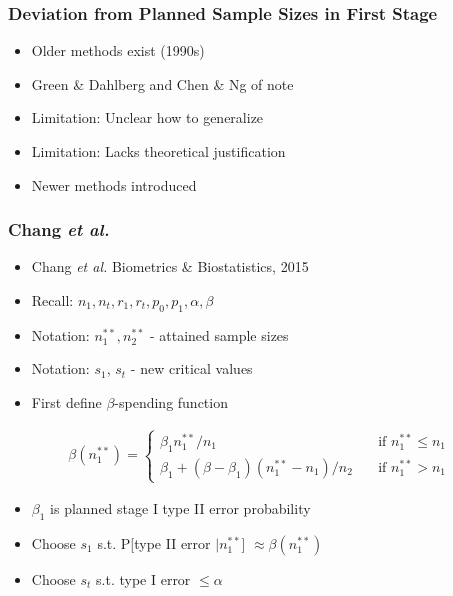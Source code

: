 \documentclass{beamer}\usepackage[]{graphicx}\usepackage[]{color}
\begin{document}
\begin{frame}
\frametitle{Deviation from Planned Sample Sizes in First Stage}
    \begin{itemize}
        \item Older methods exist (1990s)
        \item Green \& Dahlberg and Chen \& Ng of note
        \item Limitation: Unclear how to generalize
        \item Limitation: Lacks theoretical justification
        \item Newer methods introduced
    \end{itemize}
\end{frame}



\begin{frame}
\frametitle{Chang \textit{et al.}}
    \begin{itemize}
        \item Chang \textit{et al.} Biometrics \& Biostatistics, 2015
        \item Recall: $n_1, n_t, r_1, r_t, p_0, p_1, \alpha, \beta$
        \item Notation: $n_1^{\ast\ast}, n_2^{\ast\ast}$ - attained sample sizes
        \item Notation: $s_1$, $s_t$ - new critical values
        \item First define $\beta$-spending function
    \end{itemize}
\begin{equation*}
\begin{aligned}
\beta(n_1^{\ast\ast}) = \left\{
        \begin{array}{ll}
            \beta_1 n_1^{\ast\ast}/n_1 & \quad \text{if } n_1^{\ast\ast} \leq n_1 \\
            \beta_1 + (\beta - \beta_1)(n_1^{\ast\ast} - n_1)/n_2 & \quad \text{if } n_1^{\ast\ast} > n_1
        \end{array}
    \right.
\end{aligned}
\end{equation*}
  \begin{itemize}
      \item $\beta_1$ is planned stage I type II error probability
      \item Choose $s_1$ s.t. P[type II error $\vert n_1^{\ast\ast}$] $\approx \beta(n_1^{\ast\ast})$
      \item Choose $s_t$ s.t. type I error $\leq \alpha$
  \end{itemize}
\end{frame}
\end{document}
